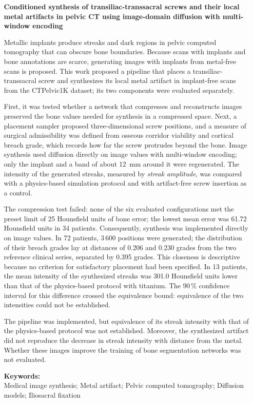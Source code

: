 
\begin{center}
\large \vspace{-1.5cm} \textbf{Conditioned synthesis of transiliac-transsacral screws and their local metal artifacts in pelvic CT using image-domain diffusion with multi-window encoding}
\end{center}

Metallic implants produce streaks and dark regions in pelvic computed tomography that can obscure bone boundaries. Because scans with implants and bone annotations are scarce, generating images with implants from metal-free scans is proposed. This work proposed a pipeline that places a transiliac-transsacral screw and synthesizes its local metal artifact in implant-free scans from the CTPelvic1K dataset; its two components were evaluated separately.

First, it was tested whether a network that compresses and reconstructs images preserved the bone values needed for synthesis in a compressed space. Next, a placement sampler proposed three-dimensional screw positions, and a measure of surgical admissibility was defined from osseous corridor viability and cortical breach grade, which records how far the screw protrudes beyond the bone. Image synthesis used diffusion directly on image values with multi-window encoding; only the implant and a band of about 12~mm around it were regenerated. The intensity of the generated streaks, measured by \emph{streak amplitude}, was compared with a physics-based simulation protocol and with artifact-free screw insertion as a control.

The compression test failed: none of the six evaluated configurations met the preset limit of 25 Hounsfield units of bone error; the lowest mean error was 61.72 Hounsfield units in 34 patients. Consequently, synthesis was implemented directly on image values. In 72 patients, 3\,600 positions were generated; the distribution of their breach grades lay at distances of 0.206 and 0.230 grades from the two reference clinical series, separated by 0.395 grades. This closeness is descriptive because no criterion for satisfactory placement had been specified. In 13 patients, the mean intensity of the synthesized streaks was 301.0 Hounsfield units lower than that of the physics-based protocol with titanium. The 90\,\% confidence interval for this difference crossed the equivalence bound: equivalence of the two intensities could not be established.

The pipeline was implemented, but equivalence of its streak intensity with that of the physics-based protocol was not established.  Moreover, the synthesized artifact did not reproduce the decrease in streak intensity with distance from the metal. Whether these images improve the training of bone segmentation networks was not evaluated.

\noindent \textbf{Keywords:}\\
\noindent Medical image synthesis; Metal artifact; Pelvic computed tomography; Diffusion models; Iliosacral fixation
